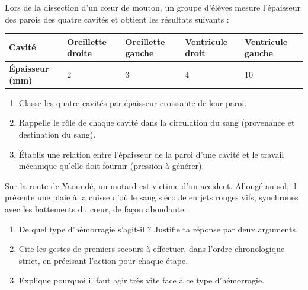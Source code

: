 \documentclass[11pt]{article}
\begin{document}
\begin{exercice}
Lors de la dissection d'un c\oe ur de mouton, un groupe d'élèves mesure l'épaisseur des parois des quatre cavités et obtient les résultats suivants :
\begin{center}
\begin{tabularx}{\linewidth}{|l|X|X|X|X|}\hline
\rowcolor{popblueL}
\textbf{Cavité} & Oreillette droite & Oreillette gauche & Ventricule droit & Ventricule gauche \\ \hline
\textbf{Épaisseur (mm)} & 2 & 3 & 4 & 10 \\ \hline
\end{tabularx}
\end{center}
\begin{enumerate}
\item Classe les quatre cavités par épaisseur croissante de leur paroi.
\item Rappelle le rôle de chaque cavité dans la circulation du sang (provenance et destination du sang).
\item Établis une relation entre l'épaisseur de la paroi d'une cavité et le travail mécanique qu'elle doit fournir (pression à générer).
\end{enumerate}
\end{exercice}

\begin{exercice}
Sur la route de Yaoundé, un motard est victime d'un accident. Allongé au sol, il présente une plaie à la cuisse d'où le sang s'écoule en jets rouges vifs, synchrones avec les battements du c\oe ur, de façon abondante.
\begin{enumerate}
\item De quel type d'hémorragie s'agit-il ? Justifie ta réponse par deux arguments.
\item Cite les gestes de premiers secours à effectuer, dans l'ordre chronologique strict, en précisant l'action pour chaque étape.
\item Explique pourquoi il faut agir très vite face à ce type d'hémorragie.
\end{enumerate}
\end{exercice}
\end{document}
